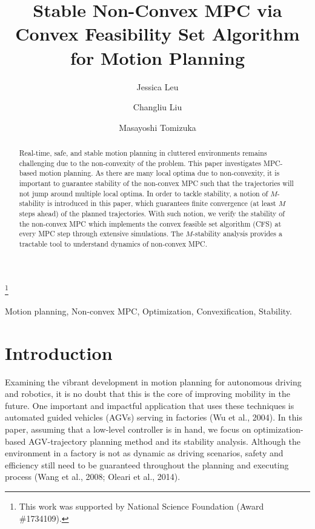 \documentclass{ifacconf}
\begin{document}
\begin{frontmatter}

\title{Stable Non-Convex MPC via Convex Feasibility Set Algorithm for Motion Planning} 

\thanks[footnoteinfo]{This work was supported by National Science Foundation (Award \#1734109).}

\author[First]{ Jessica Leu} 
\author[Second]{ Changliu Liu} 
\author[First]{ Masayoshi Tomizuka}

\address[First]{ University of California,
Berkeley, CA 94720 USA\\ \tt jess.leu24@berkeley.edu, tomizuka@me.berkeley.edu}
\address[Second]{ Stanford University, CA 94305 USA\\ \tt  changliuliu@stanford.edu}


\begin{abstract}                %
Real-time, safe, and stable motion planning in cluttered environments remains challenging due to the non-convexity of the problem. This paper investigates MPC-based motion planning. As there are many local optima due to non-convexity, it is important to guarantee stability of the non-convex MPC such that the trajectories will not jump around multiple local optima. In order to tackle stability, a notion of $M$-stability is introduced in this paper, which guarantees finite convergence (at least $M$ steps ahead) of the planned trajectories. With such notion, we verify the stability of the non-convex MPC which implements the convex feasible set algorithm (CFS) at every MPC step through extensive simulations. The $M$-stability analysis provides a tractable tool to understand dynamics of non-convex MPC.
 

\end{abstract}

\begin{keyword}
Motion planning, Non-convex MPC, Optimization, Convexification, Stability.
\end{keyword}

\end{frontmatter}

\section{Introduction}
Examining the vibrant development in motion planning for autonomous driving and robotics, it is no doubt that this is the core of improving mobility in the future. One important and impactful application that uses these techniques is automated guided vehicles (AGVs) serving in factories (Wu et al., 2004). In this paper, assuming that a low-level controller is in hand, we focus on optimization-based AGV-trajectory planning method and its stability analysis. Although the environment in a factory is not as dynamic as driving scenarios, safety and efficiency still need to be guaranteed throughout the planning and executing process (Wang et al., 2008; Oleari et al., 2014).
\end{document}
